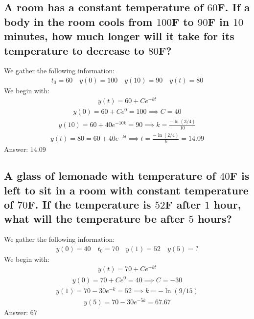 \documentclass{article}
\begin{document}
\subsection{A room has a constant temperature of $60$F. If a body in the room cools from $100$F to $90$F in $10$ minutes, how much longer will it take for its temperature to decrease to $80$F?}
We gather the following information:
\begin{align*}
	t_0 = 60 \quad y(0) = 100 \quad y(10) = 90 \quad y(t) = 80
\end{align*}
We begin with:
\begin{align*}
	y(t) = 60 + Ce^{-kt}
\end{align*}
\begin{align*}
	y(0) = 60 + Ce^0 = 100 \implies C = 40
\end{align*}
\begin{align*}
	y(10) = 60 + 40e^{-10k} = 90 \implies k = \frac{-\ln{(3/4)}}{10}
\end{align*}
\begin{align*}
	y(t) = 80 = 60 + 40e^{-kt} \implies t = \frac{-\ln{(2/4)}}{k} = 14.09
\end{align*}
Answer: $14.09$

\subsection{A glass of lemonade with temperature of $40$F is left to sit in a room with constant temperature of $70$F. If the temperature is $52$F after $1$ hour, what will the temperature be after $5$ hours?}
We gather the following information:
\begin{align*}
	y(0) = 40 \quad t_0 = 70 \quad y(1) = 52 \quad y(5) = ?
\end{align*}
We begin with:
\begin{align*}
	y(t) = 70 + Ce^{-kt}
\end{align*}
\begin{align*}
	y(0) = 70 + Ce^0 = 40 \implies C = -30
\end{align*}
\begin{align*}
	y(1) = 70 - 30e^{-k} = 52 \implies k = -\ln{(9/15)}
\end{align*}
\begin{align*}
	y(5) = 70 - 30e^{-5k} = 67.67
\end{align*}
Answer: $67$

\end{document}
